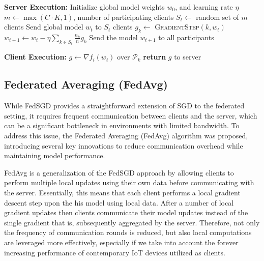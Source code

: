 \begin{algorithm}[H]
    \caption{Federated Stochastic Gradient Descent (FedSGD)}
    \label{alg:fedsgd}
    \begin{algorithmic}[1]
        \State \textbf{Server Execution:}
        \State Initialize global model weights $w_0$, and learning rate $\eta$
        \State $m \gets \max(C \cdot K, 1)$, number of participating clients
        \State $S_t \gets$ random set of $m$ clients
        \State Send global model $w_t$ to $S_t$ clients
        \State $g_k \gets$ \textsc{GradientStep}$(k, w_t)$
        \EndFor
        \State $w_{t+1} \gets w_t - \eta \sum_{k \in S_t} \frac{n_k}{n} g_k$
        \State Send the model $w_{t+1}$ to all participants
        \EndFor

        \vspace{1em}
        \State \textbf{Client Execution:}
        \State $g \gets \nabla f_i(w_t)$ over $\mathcal{P}_k$
        \State \textbf{return} $g$ to server
        \EndProcedure
    \end{algorithmic}
\end{algorithm}

\subsection{Federated Averaging (FedAvg)}
While FedSGD provides a straightforward extension of SGD to the federated setting, it requires frequent communication between clients
and the server, which can be a significant bottleneck in environments with limited bandwidth. To address this issue, the Federated
Averaging (FedAvg) algorithm was proposed, introducing several key innovations to reduce communication overhead while maintaining
model performance.

FedAvg is a generalization of the FedSGD approach by allowing clients to perform multiple local updates using their own data before communicating
with the server. Essentially, this means that each client performs a local gradient descent step upon the his model using local data.
After a number of local gradient updates then clients communicate their model updates instead of the single gradient that is, subsequently
aggregated by the server. Therefore, not only the frequency of communication rounds is reduced, but also local computations are leveraged
more effectively, especially if we take into account the forever increasing performance of contemporary IoT devices utilized as clients.

